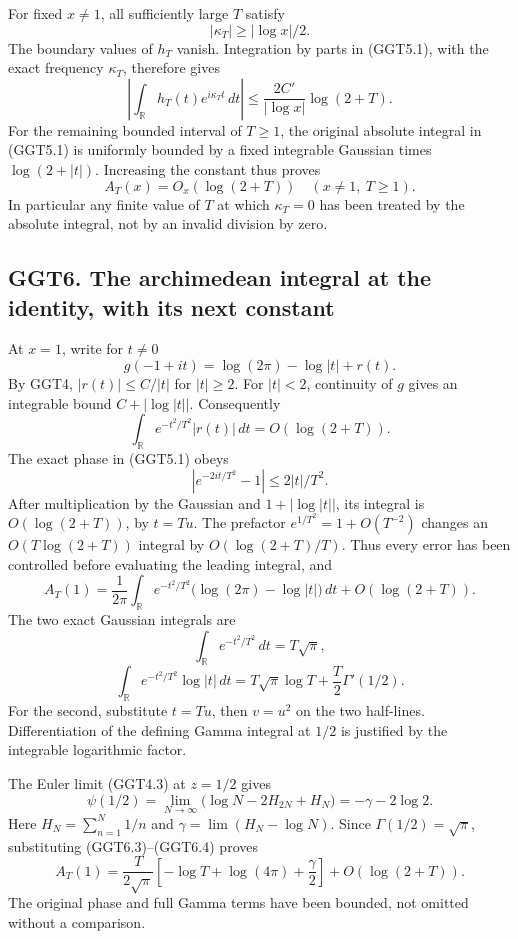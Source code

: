 For fixed \(x\ne1\), all sufficiently large \(T\) satisfy \[
|\kappa_T|\ge|\log x|/2.
\] The boundary values of \(h_T\) vanish. Integration by parts in
(GGT5.1), with the exact frequency \(\kappa_T\), therefore gives \[
\left|\int_{\mathbb R}h_T(t)e^{i\kappa_Tt}\,dt\right|
\le\frac{2C'}{|\log x|}\log(2+T).
\] For the remaining bounded interval of \(T\ge1\), the original
absolute integral in (GGT5.1) is uniformly bounded by a fixed integrable
Gaussian times \(\log(2+|t|)\). Increasing the constant thus proves \[
\boxed{A_T(x)=O_x(\log(2+T))\quad(x\ne1,\ T\ge1).}
\tag{GGT5.3}
\] In particular any finite value of \(T\) at which \(\kappa_T=0\) has
been treated by the absolute integral, not by an invalid division by
zero.

\subsection{GGT6. The archimedean integral at the identity, with its
next
constant}\label{ggt6.-the-archimedean-integral-at-the-identity-with-its-next-constant}

At \(x=1\), write for \(t\ne0\) \[
g(-1+it)=\log(2\pi)-\log|t|+r(t).
\] By GGT4, \(|r(t)|\le C/|t|\) for \(|t|\ge2\). For \(|t|<2\),
continuity of \(g\) gives an integrable bound \(C+|\log|t||\).
Consequently \[
\int_{\mathbb R}e^{-t^2/T^2}|r(t)|\,dt=O(\log(2+T)).
\tag{GGT6.1}
\] The exact phase in (GGT5.1) obeys \[
|e^{-2it/T^2}-1|\le2|t|/T^2.
\] After multiplication by the Gaussian and \(1+|\log|t||\), its
integral is \(O(\log(2+T))\), by \(t=Tu\). The prefactor
\(e^{1/T^2}=1+O(T^{-2})\) changes an \(O(T\log(2+T))\) integral by
\(O(\log(2+T)/T)\). Thus every error has been controlled before
evaluating the leading integral, and \[
A_T(1)=\frac1{2\pi}
\int_{\mathbb R}e^{-t^2/T^2}
\bigl(\log(2\pi)-\log|t|\bigr)\,dt
+O(\log(2+T)).
\tag{GGT6.2}
\] The two exact Gaussian integrals are \[
\int_{\mathbb R}e^{-t^2/T^2}\,dt=T\sqrt\pi,
\] \[
\int_{\mathbb R}e^{-t^2/T^2}\log|t|\,dt
=T\sqrt\pi\log T+\frac T2\Gamma'(1/2).
\tag{GGT6.3}
\] For the second, substitute \(t=Tu\), then \(v=u^2\) on the two
half-lines. Differentiation of the defining Gamma integral at \(1/2\) is
justified by the integrable logarithmic factor.

The Euler limit (GGT4.3) at \(z=1/2\) gives \[
\psi(1/2)=
\lim_{N\to\infty}\bigl(\log N-2H_{2N}+H_N\bigr)
=-\gamma-2\log2.
\tag{GGT6.4}
\] Here \(H_N=\sum_{n=1}^N1/n\) and \(\gamma=\lim(H_N-\log N)\). Since
\(\Gamma(1/2)=\sqrt\pi\), substituting (GGT6.3)--(GGT6.4) proves \[
\boxed{
A_T(1)=\frac{T}{2\sqrt\pi}
\left[-\log T+\log(4\pi)+\frac\gamma2\right]
+O(\log(2+T)).
}
\tag{GGT6.5}
\] The original phase and full Gamma terms have been bounded, not
omitted without a comparison.

